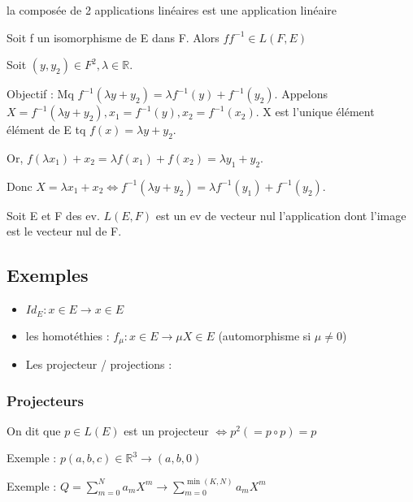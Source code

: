 \documentclass[french]{yLectureNote}
\newcommand{\R}[0]{\mathbb{R}}
\begin{document}
\begin{proposition}
la composée de 2 applications linéaires est une application linéaire
\end{proposition}
\begin{proposition}
Soit f un isomorphisme de E dans F. Alors \(ff^{-1} \in L(F,E)\)
\end{proposition}
\begin{myproof}
 Soit $(y,y_2)\in F^2, \lambda \in \R$.

 Objectif : Mq $f^{-1}(\lambda y + y_2) = \lambda f^{-1}(y)+f^{-1}(y_2)$. Appelons $X = f^{-1}(\lambda y+y_2), x_1 = f^{-1}(y), x_2=f^{-1}(x_2)$. X est l'unique élément élément de E tq $f(x) = \lambda y + y_2$.

 Or, $f(\lambda x_1)+x_2 = \lambda f(x_1)+f(x_2) = \lambda y_1+y_2$.

 Donc $X = \lambda x_1+x_2 \iff f^{-1}(\lambda y+y_2) = \lambda f^{-1}(y_1)+f^{-1}(y_2)$.
\end{myproof}
\begin{proposition}
Soit E et F des ev. $L(E,F)$ est un ev de vecteur nul l'application dont l'image est le vecteur nul de F.
\end{proposition}
\subsection{Exemples}
\begin{itemize}
 \item $Id_E : x\in E \to x\in E$
 \item les homotéthies : $f_{\mu} : x\in E \to \mu X\in E$ (automorphisme si $\mu\neq 0$)
 \item Les projecteur / projections :
\end{itemize}
\subsubsection{Projecteurs}
\begin{definition}[Projecteurs]
On dit que \(p\in L(E)\) est un projecteur $\iff p^2 (= p\circ p) = p$
\end{definition}
Exemple : $p(a,b,c)\in \R^3 \to (a,b,0)$

Exemple : $Q = \sum_{m=0}^N a_mX^m \to \sum_{m=0}^{\min(K,N)} a_mX^m$
\end{document}
